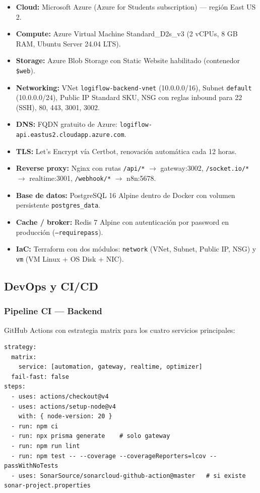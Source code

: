 \documentclass[12pt,a4paper,oneside]{article}
\begin{document}
\begin{itemize}[leftmargin=*]
  \item \textbf{Cloud:} Microsoft Azure (Azure for Students subscription) --- regi\'on East US 2.
  \item \textbf{Compute:} Azure Virtual Machine Standard\_D2s\_v3 (2 vCPUs, 8 GB RAM, Ubuntu Server 24.04 LTS).
  \item \textbf{Storage:} Azure Blob Storage con Static Website habilitado (contenedor \texttt{\$web}).
  \item \textbf{Networking:} VNet \texttt{logiflow-backend-vnet} (10.0.0.0/16), Subnet \texttt{default} (10.0.0.0/24), Public IP Standard SKU, NSG con reglas inbound para 22 (SSH), 80, 443, 3001, 3002.
  \item \textbf{DNS:} FQDN gratuito de Azure: \texttt{logiflow-api.eastus2.cloudapp.azure.com}.
  \item \textbf{TLS:} Let's Encrypt v\'ia Certbot, renovaci\'on autom\'atica cada 12 horas.
  \item \textbf{Reverse proxy:} Nginx con rutas \texttt{/api/*} $\rightarrow$ gateway:3002, \texttt{/socket.io/*} $\rightarrow$ realtime:3001, \texttt{/webhook/*} $\rightarrow$ n8n:5678.
  \item \textbf{Base de datos:} PostgreSQL 16 Alpine dentro de Docker con volumen persistente \texttt{postgres\_data}.
  \item \textbf{Cache / broker:} Redis 7 Alpine con autenticaci\'on por password en producci\'on (\texttt{--requirepass}).
  \item \textbf{IaC:} Terraform con dos m\'odulos: \texttt{network} (VNet, Subnet, Public IP, NSG) y \texttt{vm} (VM Linux + OS Disk + NIC).
\end{itemize}

\subsection{DevOps y CI/CD}

\subsubsection{Pipeline CI --- Backend}

GitHub Actions con estrategia matrix para los cuatro servicios principales:

\begin{lstlisting}[caption={Workflow CI del backend (.github/workflows/ci.yml)}]
strategy:
  matrix:
    service: [automation, gateway, realtime, optimizer]
  fail-fast: false
steps:
  - uses: actions/checkout@v4
  - uses: actions/setup-node@v4
    with: { node-version: 20 }
  - run: npm ci
  - run: npx prisma generate    # solo gateway
  - run: npm run lint
  - run: npm test -- --coverage --coverageReporters=lcov --passWithNoTests
  - uses: SonarSource/sonarcloud-github-action@master   # si existe sonar-project.properties
\end{lstlisting}
\end{document}
